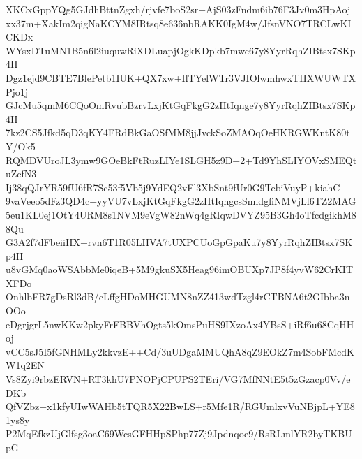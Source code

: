 XKCxGppYQg5GJdhBttnZgxh/rjvfe7boS2sr+AjS03zFndm6ib76F3Jv0m3HpAoj
xx37m+XakIm2qigNaKCYM8IRtsq8e636nbRAKK0IgM4w/JfsnVNO7TRCLwKICKDx
WYsxDTuMN1B5n6l2iuquwRiXDLuapjOgkKDpkb7mwc67y8YyrRqhZIBtsx7SKp4H
Dgz1ejd9CBTE7BlePetb1IUK+QX7xw+IlTYelWTr3VJIOlwmhwxTHXWUWTXPjo1j
GJcMu5qmM6CQoOmRvubBzrvLxjKtGqFkgG2zHtIqnge7y8YyrRqhZIBtsx7SKp4H
7kz2CS5Jfkd5qD3qKY4FRdBkGaOSfMM8jjJvckSoZMAOqOeHKRGWKntK80tY/Ok5
RQMDVUroJL3ymw9GOeBkFtRuzLIYe1SLGH5z9D+2+Td9YhSLIYOVxSMEQtuZcfN3
Ij38qQJrYR59fU6fR7Sc53f5Vb5j9YdEQ2vFl3XbSnt9fUr0G9TebiVuyP+kiahC
9vaVeeo5dFz3QD4c+yyVU7vLxjKtGqFkgG2zHtIqngcsSmldgfiNMVjLl6TZ2MAG
5eu1KL0ej1OtY4URM8s1NVM9eVgW82nWq4gRIqwDVYZ95B3Gh4oTfcdgikhM88Qu
G3A2f7dFbeiiHX+rvn6T1R05LHVA7tUXPCUoGpGpaKu7y8YyrRqhZIBtsx7SKp4H
u8vGMq0aoWSAbbMe0iqeB+5M9gkuSX5Heag96imOBUXp7JP8f4yvW62CrKITXFDo
OnhlbFR7gDsRl3dB/cLffgHDoMHGUMN8nZZ413wdTzgl4rCTBNA6t2GIbba3nOOo
eDgrjgrL5nwKKw2pkyFrFBBVhOgts5kOmsPuHS9IXzoAx4YBsS+iRf6u68CqHHoj
vCC5sJ5I5fGNHMLy2kkvzE++Cd/3uUDgaMMUQhA8qZ9EOkZ7m4SobFMcdKW1q2EN
Vs8Zyi9rbzERVN+RT3khU7PNOPjCPUPS2TEri/VG7MfNNtE5t5zGzacp0Vv/eDKb
QfVZbz+x1kfyUIwWAHb5tTQR5X22BwLS+r5Mfe1R/RGUmlxvVuNBjpL+YE81ys8y
P2MqEfkzUjGlfsg3oaC69WcsGFHHpSPhp77Zj9Jpdnqoe9/RsRLmlYR2byTKBUpG
